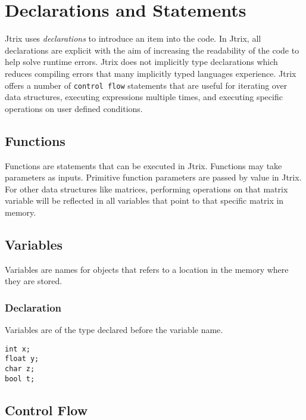 \documentclass[12pt]{report}
\begin{document}

\chapter{Declarations and Statements}
Jtrix uses \textit{declarations} to introduce an item into the code. In Jtrix, all declarations are explicit with the aim of increasing the readability of the code to help solve runtime errors. Jtrix does not implicitly type declarations which reduces compiling errors that many implicitly typed languages experience. Jtrix offers a number of \texttt{control flow} statements that are useful for iterating over data structures, executing expressions multiple times, and executing specific operations on user defined conditions. 
\section{Functions}
Functions are statements that can be executed in Jtrix. Functions may take parameters as inputs. Primitive function parameters are passed by value in Jtrix. For other data structures like matrices, performing operations on that matrix variable will be reflected in all variables that point to that specific matrix in memory. 
\section{Variables}
Variables are names for objects that refers to a location in the memory where they are stored. 
\subsection{Declaration}
Variables are of the type declared before the variable name. 
\begin{lstlisting}
int x; 
float y; 
char z; 
bool t; 
\end{lstlisting}
\section{Control Flow}
\end{document}
